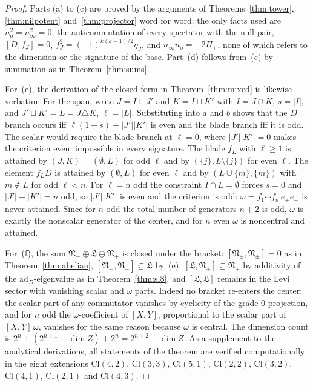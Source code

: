 \documentclass{birkjour}
\theoremstyle{definition}
\theoremstyle{remark}
\numberwithin{equation}{section}
\newcommand{\Cl}{\mathrm{Cl}}
\newcommand{\fkN}{\mathfrak{N}}
\newcommand{\fkL}{\mathfrak{L}}
\newcommand{\no}{n_{\mathrm{o}}}
\newcommand{\ninf}{n_{\infty}}
\newcommand{\ad}{\mathrm{ad}}
\newenvironment{revblock}{}{}
\begin{document}
\begin{revblock}
\begin{proof}
Parts (a) to (c) are proved by the arguments of
Theorems~\ref{thm:tower}, \ref{thm:nilpotent}
and~\ref{thm:projector} word for word: the only facts used
are $\no^2=\ninf^2=0$, the anticommutation of every
spectator with the null pair, $[D,f_J]=0$,
$f_J^2=(-1)^{k(k-1)/2}\eta_J$, and $\ninf\no=-2\Pi_+$, none
of which refers to the dimension or the signature of the
base. Part~(d) follows from~(c) by summation as in
Theorem~\ref{thm:sums}.

For~(e), the derivation of the closed form in
Theorem~\ref{thm:mixed} is likewise verbatim. For the span,
write $J=I\sqcup J'$ and $K=I\sqcup K'$ with $I=J\cap K$,
$s=|I|$, and $J'\sqcup K'=L=J\triangle K$, $\ell=|L|$.
Substituting into $a$ and $b$ shows that the $D$ branch
occurs iff $\ell(1+s)+|J'||K'|$ is even and the blade branch
iff it is odd. The scalar would require the blade branch at
$\ell=0$, where $|J'||K'|=0$ makes the criterion even:
impossible in every signature. The blade $f_L$ with
$\ell\geq1$ is attained by $(J,K)=(\emptyset,L)$ for odd
$\ell$ and by $(\{j\},L\setminus\{j\})$ for even $\ell$. The
element $f_L D$ is attained by $(\emptyset,L)$ for even
$\ell$ and by $(L\cup\{m\},\{m\})$ with $m\notin L$ for odd
$\ell<n$. For $\ell=n$ odd the constraint $I\cap L=\emptyset$
forces $s=0$ and $|J'|+|K'|=n$ odd, so $|J'||K'|$ is even
and the criterion is odd: $\omega=f_1\cdots f_n\,e_+e_-$ is
never attained. Since for $n$ odd the total number of
generators $n+2$ is odd, $\omega$ is exactly the nonscalar
generator of the center, and for $n$ even $\omega$ is
noncentral and attained.

For~(f), the sum $\fkN_-\oplus\fkL\oplus\fkN_+$ is closed
under the bracket: $[\fkN_\pm,\fkN_\pm]=0$ as in
Theorem~\ref{thm:abelian}, $[\fkN_+,\fkN_-]\subseteq\fkL$
by~(e), $[\fkL,\fkN_\pm]\subseteq\fkN_\pm$ by additivity of
the $\ad_D$-eigenvalue as in Theorem~\ref{thm:sl8}, and
$[\fkL,\fkL]$ remains in the Levi sector with vanishing
scalar and $\omega$ parts. Indeed no bracket re-enters the
center: the scalar part of any commutator vanishes by
cyclicity of the grade-0 projection, and for $n$ odd the
$\omega$-coefficient of $[X,Y]$, proportional to the scalar
part of $[X,Y]\,\omega$, vanishes for the same reason
because $\omega$ is central. The dimension count is
$2^n+(2^{n+1}-\dim Z)+2^n=2^{n+2}-\dim Z$. As a supplement to 
the analytical derivations, all statements
of the theorem are verified computationally in the eight
extensions $\Cl(4,2)$, $\Cl(3,3)$, $\Cl(5,1)$, $\Cl(2,2)$,
$\Cl(3,2)$, $\Cl(4,1)$, $\Cl(2,1)$ and $\Cl(4,3)$.
\end{proof}


\end{revblock}
\end{document}
